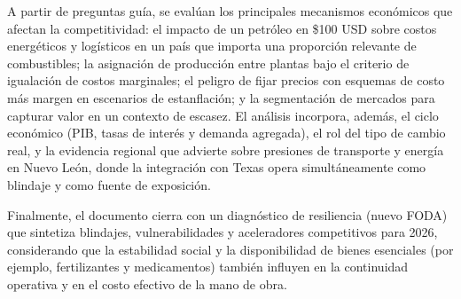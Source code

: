 \documentclass[11pt,a4paper]{article}
\begin{document}
A partir de preguntas guía, se evalúan los principales mecanismos económicos que afectan la competitividad: el impacto de un petróleo en \$100 USD sobre costos energéticos y logísticos en un país que importa una proporción relevante de combustibles; la asignación de producción entre plantas bajo el criterio de igualación de costos marginales; el peligro de fijar precios con esquemas de costo más margen en escenarios de estanflación; y la segmentación de mercados para capturar valor en un contexto de escasez. El análisis incorpora, además, el ciclo económico (PIB, tasas de interés y demanda agregada), el rol del tipo de cambio real, y la evidencia regional que advierte sobre presiones de transporte y energía en Nuevo León, donde la integración con Texas opera simultáneamente como blindaje y como fuente de exposición.

Finalmente, el documento cierra con un diagnóstico de resiliencia (nuevo FODA) que sintetiza blindajes, vulnerabilidades y aceleradores competitivos para 2026, considerando que la estabilidad social y la disponibilidad de bienes esenciales (por ejemplo, fertilizantes y medicamentos) también influyen en la continuidad operativa y en el costo efectivo de la mano de obra.
\par
\endgroup

\vspace{2cm}

{
  \hypersetup{linkcolor=black} %
  \tableofcontents
}

\end{document}
